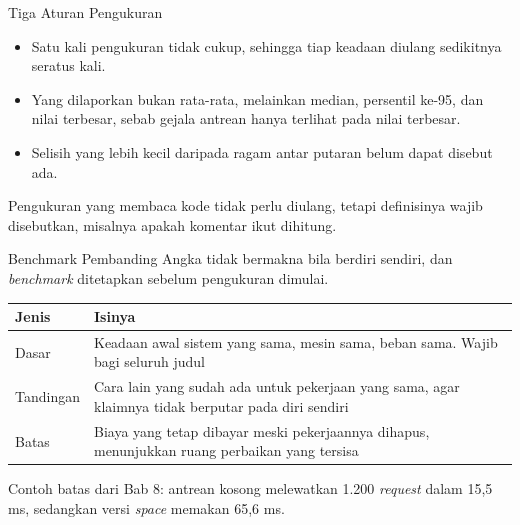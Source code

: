 \documentclass[aspectratio=169, table, 12pt]{beamer}
\begin{document}
\begin{frame}{{\Large Tiga Aturan Pengukuran}}
  \vspace{10pt}
  \begin{itemize}\small
    \item Satu kali pengukuran tidak cukup, sehingga tiap keadaan diulang
          sedikitnya seratus kali.
    \item Yang dilaporkan bukan rata-rata, melainkan median, persentil ke-95,
          dan nilai terbesar, sebab gejala antrean hanya terlihat pada nilai
          terbesar.
    \item Selisih yang lebih kecil daripada ragam antar putaran belum dapat
          disebut ada.
  \end{itemize}

  \vspace{8pt}
  {\small Pengukuran yang membaca kode tidak perlu diulang, tetapi definisinya
  wajib disebutkan, misalnya apakah komentar ikut dihitung.}
\end{frame}

\begin{frame}{{\Large Benchmark Pembanding}}
  \vspace{6pt}
  {\small Angka tidak bermakna bila berdiri sendiri, dan \textit{benchmark}
  ditetapkan sebelum pengukuran dimulai.}

  \vspace{6pt}
  \centering
  \small
  \begin{tabularx}{0.95\textwidth}{|l|X|}
    \hline
    \textbf{Jenis} & \textbf{Isinya} \\
    \hline
    Dasar & Keadaan awal sistem yang sama, mesin sama, beban sama. Wajib bagi seluruh judul \\
    \hline
    Tandingan & Cara lain yang sudah ada untuk pekerjaan yang sama, agar klaimnya tidak berputar pada diri sendiri \\
    \hline
    Batas & Biaya yang tetap dibayar meski pekerjaannya dihapus, menunjukkan ruang perbaikan yang tersisa \\
    \hline
  \end{tabularx}

  \vspace{6pt}
  \raggedright
  {\small Contoh batas dari Bab 8: antrean kosong melewatkan 1.200
  \textit{request} dalam 15,5 ms, sedangkan versi \textit{space} memakan
  65,6 ms.}
\end{frame}
\end{document}
